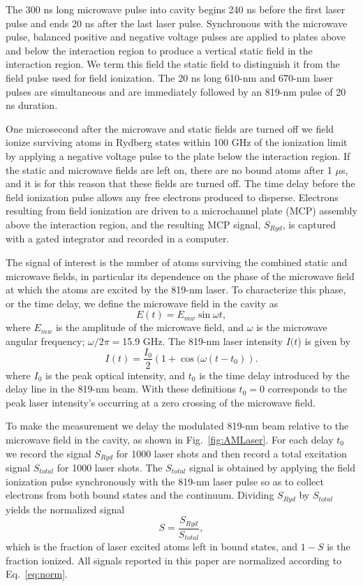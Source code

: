 \documentclass[aps,pra,reprint,groupedaddress]{revtex4-1}
\begin{document}
The 300 ns long microwave pulse into cavity begins 240 ns before the first laser pulse and ends 20 ns after the last laser pulse. Synchronous with the microwave pulse, balanced positive and negative voltage pulses are applied to plates above and below the interaction region to produce a vertical static field in the interaction region. We term this field the static field to distinguish it from the field pulse used for field ionization. The 20 ns long 610-nm and 670-nm laser pulses are simultaneous and are immediately followed by an 819-nm pulse of 20 ns duration.

One microsecond after the microwave and static fields are turned off we field ionize surviving atoms in Rydberg states within 100 GHz of the ionization limit by applying a negative voltage pulse to the plate below the interaction region. If the static and microwave fields are left on, there are no bound atoms after 1 $\mu$s, and it is for this reason that these fields are turned off. The time delay before the field ionization pulse allows any free electrons produced to disperse. Electrons resulting from field ionization are driven to a microchannel plate (MCP) assembly above the interaction region, and the resulting MCP signal, $S_{Ryd}$, is captured with a gated integrator and recorded in a computer.

The signal of interest is the number of atoms surviving the combined static and microwave fields, in particular its dependence on the phase of the microwave field at which the atoms are excited by the 819-nm laser.
To characterize this phase, or the time delay, we define the microwave field in the cavity as
\begin{equation}
E(t) =E_{mw}\sin{\omega t},
\end{equation}
where $E_{mw}$ is the amplitude of the microwave field, and $\omega$ is the microwave angular frequency; $\omega/2\pi=$15.9 GHz. The 819-nm laser intensity $I(t$) is given by
\begin{equation} \label{eq:AMLaser}
I(t) =\frac{I_0}{2}(1+\cos{(\omega (t-t_0)}).
\end{equation}
where $I_0$ is the peak optical intensity, and $t_0$ is the time delay introduced by the delay line in the 819-nm beam. With these definitions $t_0=0$ corresponds to the peak laser intensity's occurring at a zero crossing of the microwave field.

To make the measurement we delay the modulated 819-nm beam relative to the microwave field in the cavity, as shown in Fig.~\ref{fig:AMLaser}. For each delay $t_0$ we record the signal $S_{Ryd}$ for 1000 laser shots and then record a total excitation signal $S_{total}$ for 1000 laser shots. The $S_{total}$ signal is obtained by applying the field ionization pulse synchronously with the 819-nm laser pulse so as to collect electrons from both bound states and the continuum. Dividing $S_{Ryd}$ by $S_{total}$ yields the normalized signal
\begin{equation} \label{eq:norm}
S=\frac{S_{Ryd}}{S_{total}},
\end{equation}
which is the fraction of laser excited atoms left in bound states, and $1-S$ is the fraction ionized. All signals reported in this paper are normalized according to Eq.~\ref{eq:norm}.
\end{document}
